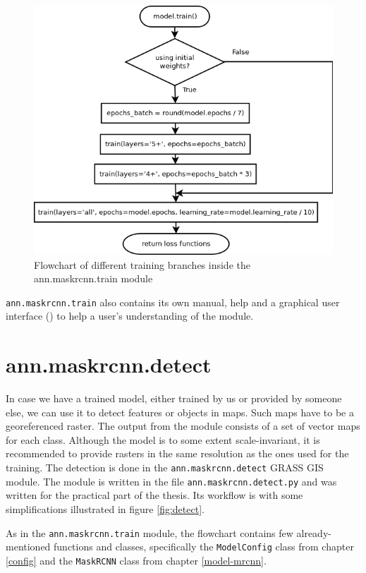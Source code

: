 \begin{figure}[H]
   \centering
	\includegraphics[width=\linewidth]{./pictures/training_dia.png}
	\caption[ann.maskrcnn.train training flowchart]{Flowchart of different training branches inside the ann.maskrcnn.train module}
      \label{fig:training}
\end{figure}

\verb|ann.maskrcnn.train| also contains its own manual, help and a graphical user interface () to help a user's understanding of the module.

\section{ann.maskrcnn.detect}
\label{detect-module}

In case we have a trained model, either trained by us or provided by someone else, we can use it to detect features or objects in maps. Such maps have to be a georeferenced raster. The output from the module consists of a set of vector maps for each class. Although the model is to some extent scale-invariant, it is recommended to provide rasters in the same resolution as the ones used for the training. The detection is done in the \verb|ann.maskrcnn.detect| GRASS GIS module. The module is written in the file \verb|ann.maskrcnn.detect.py| and was written for the practical part of the thesis. Its workflow is with some simplifications illustrated in figure \ref{fig:detect}.

As in the \verb|ann.maskrcnn.train| module, the flowchart contains few already-mentioned functions and classes, specifically the \verb|ModelConfig| class from chapter \ref{config} and the \verb|MaskRCNN| class from chapter \ref{model-mrcnn}.

